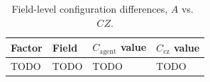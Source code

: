 \begin{table}[htbp]
  \centering
  \caption{Field-level configuration differences, $A$ vs.\ $CZ$.}
  \label{tab:config-diff}
  \begin{tabular}{llll}
    \toprule
    Factor & Field & $C_{\text{agent}}$ value & $C_{\text{cz}}$ value \\
    \midrule
    TODO & TODO & TODO & TODO \\
    \bottomrule
  \end{tabular}
\end{table}
